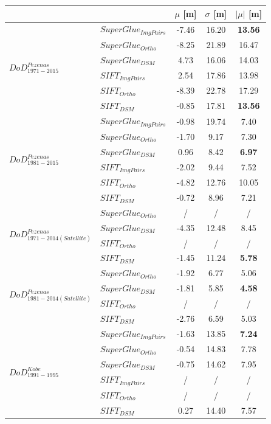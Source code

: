 \begin{table}%
	\footnotesize
	\centering
	\begin{tabular}{||l|l|c|c|c||}\hline
		& &$\mu$ [m]&$\sigma$ [m]&$|\mu|$ [m]\\\hline\hline		
		\multirow{6}{*}{$DoD^{Pezenas}_{1971-2015}$}
&${SuperGlue_{ImgPairs}}$ & -7.46 & 16.20 & \textbf{13.56}\\
&${SuperGlue_{Ortho}}$ & -8.25 & 21.89 & 16.47\\
&${SuperGlue_{DSM}}$ & 4.73 & 16.06 & 14.03\\
&${SIFT_{ImgPairs}}$ & 2.54 & 17.86 & 13.98\\
&${SIFT_{Ortho}}$ & -8.39 & 22.78 & 17.29\\
&${SIFT_{DSM}}$ & -0.85 & 17.81 & \textbf{13.56}\\\hline
		
		\multirow{6}{*}{$DoD^{Pezenas}_{1981-2015}$}
&${SuperGlue_{ImgPairs}}$ & -0.98 & 19.74 & 7.40\\
&${SuperGlue_{Ortho}}$ & -1.70 & 9.17 & 7.30\\
&${SuperGlue_{DSM}}$ & 0.96 & 8.42 & \textbf{6.97}\\
&${SIFT_{ImgPairs}}$ & -2.02 & 9.44 & 7.52\\
&${SIFT_{Ortho}}$ & -4.82 & 12.76 & 10.05\\
&${SIFT_{DSM}}$ & -0.72 & 8.96 & 7.21\\\hline

		
		\multirow{4}{*}{$DoD^{Pezenas}_{1971-2014(Satellite)}$}
&${SuperGlue_{Ortho}}$ & / & / & /\\
&${SuperGlue_{DSM}}$ & -4.35 & 12.48 & 8.45\\
&${SIFT_{Ortho}}$ & / & / & /\\
&${SIFT_{DSM}}$ & -1.45 & 11.24 & \textbf{5.78}\\\hline

		
		\multirow{4}{*}{$DoD^{Pezenas}_{1981-2014(Satellite)}$}
&${SuperGlue_{Ortho}}$ & -1.92 & 6.77 & 5.06\\
&${SuperGlue_{DSM}}$ & -1.81 & 5.85 & \textbf{4.58} \\
&${SIFT_{Ortho}}$ & / & / & /\\		
&${SIFT_{DSM}}$ & -2.76 & 6.59 & 5.03\\\hline
		
		
		\multirow{6}{*}{$DoD^{Kobe}_{1991-1995}$}
		&${SuperGlue_{ImgPairs}}$ & -1.63 & 13.85 & \textbf{7.24}\\
		&${SuperGlue_{Ortho}}$ & -0.54 & 14.83 & 7.78\\
		&${SuperGlue_{DSM}}$ & -0.75 & 14.62 & 7.95\\
		&${SIFT_{ImgPairs}}$ & / & / & / \\
		&${SIFT_{Ortho}}$ & / & / & / \\
		&${SIFT_{DSM}}$ & 0.27 & 14.40 & 7.57\\\hline
		

\end{tabular}
\end{table}
